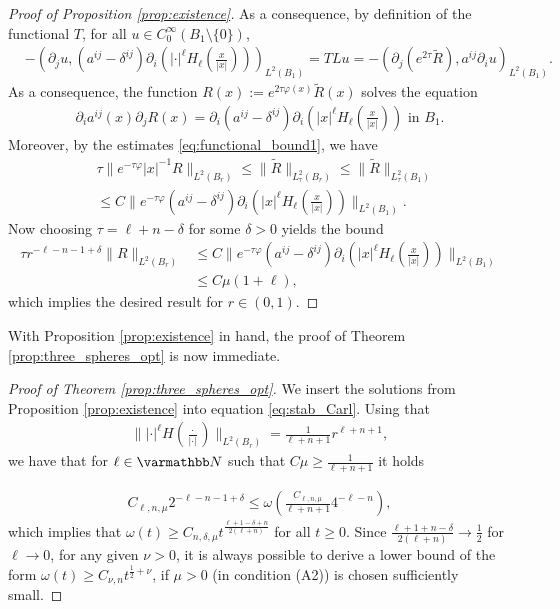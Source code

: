\documentclass[12pt,twoside]{amsart}
\numberwithin{equation}{section}
\renewcommand{\leq}{\leqslant}
\renewcommand{\geq}{\geqslant}
\newcommand {\p} {\partial}
\begin{document}
\begin{appendix}
\begin{proof}[Proof of Proposition \ref{prop:existence}]
As a consequence, by definition of the functional $T$, for all $u\in C_0^{\infty}(B_{1}\setminus \{0\})$,
\begin{align*}
& - (\p_j u, (a^{ij}-\delta^{ij}) \p_i(|\cdot|^{\ell } H_{\ell}(\frac{x}{|x|})))_{L^2(B_{1})}
 =
T L u
= -(\p_j ( e^{2\tau} \tilde{R}),  a^{ij } \p_i u)_{L^2(B_{1})}.
\end{align*}
As a consequence, the function $R (x):= e^{2\tau \varphi(x)} \tilde{R}(x)$
solves the equation
\begin{align*}
\p_i a^{ij}(x)\p_j R(x) = \p_i (a^{ij}-\delta^{ij}) \p_i(|x|^{\ell} H_{\ell}(\frac{x}{|x|})) \mbox{ in } B_{1}.
\end{align*}
Moreover, by the estimates \eqref{eq:functional_bound1}, we have 
\begin{align*}
&\tau \|e^{-\tau \varphi}|x|^{-1} R\|_{L^2(B_{r})} \leq \| \tilde{R}\|_{L^2_{\tau}(B_{r})}  \leq \| \tilde{R}\|_{L^2_{\tau}(B_{1})} \\
& \leq C \|e^{-\tau \varphi} (a^{ij}-\delta^{ij}) \p_i (|x|^{\ell}H_{\ell}(\frac{x}{|x|})) \|_{L^2(B_{1})} .
\end{align*}
Now choosing $\tau = \ell + n -\delta$ for some $\delta>0$ yields the bound
\begin{align*}
\tau r^{-\ell-n-1+\delta} \| R\|_{L^2(B_{r})} 
& \leq C \|e^{-\tau \varphi} (a^{ij}-\delta^{ij})\p_i (|x|^{\ell}H_{\ell}(\frac{x}{|x|})) \|_{L^2(B_{1})}\\
& \leq C \mu (1+\ell),
\end{align*}
which implies the desired result for $r \in (0,1)$. 
\end{proof}



With Proposition \ref{prop:existence} in hand, the proof of Theorem \ref{prop:three_spheres_opt} is now immediate.

\begin{proof}[Proof of Theorem \ref{prop:three_spheres_opt}]
We insert the solutions from Proposition \ref{prop:existence} into equation \eqref{eq:stab_Carl}. Using that
\begin{align*}
\||\cdot |^{\ell} H(\frac{\cdot}{|\cdot|}) \|_{L^2(B_r)} = \frac{1}{\ell +n+1} r^{\ell + n +1},
\end{align*}
we have that for $\ell\in \N$ such that $C\mu \geq \frac{1}{\ell + n +1}$ it holds

\begin{align*}
C_{\ell,n,\mu} 2^{-\ell-n-1+\delta} \leq  \omega(\frac{C_{\ell,n,\mu}}{\ell + n+1}  4^{-\ell-n}),
\end{align*}
which implies that $\omega(t)\geq C_{n,\delta,\mu} t^{ \frac{\ell + 1 -\delta+n}{2(\ell + n)}}$ for all $t\geq 0$. Since $\frac{\ell + 1+n-\delta}{2(\ell + n)} \rightarrow \frac{1}{2}$ for $\ell \rightarrow 0$, for any given $\nu>0$, it is always possible to derive a lower bound of the form $\omega(t)\geq C_{\nu,n}t^{\frac{1}{2}+\nu}$, if $\mu>0$ (in condition (A2)) is chosen sufficiently small.
\end{proof}






\end{appendix}
\end{document}
